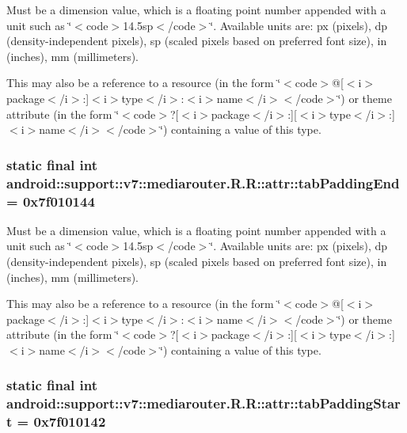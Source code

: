 Must be a dimension value, which is a floating point number appended with a unit such as \char`\"{}$<$code$>$14.5sp$<$/code$>$\char`\"{}. Available units are: px (pixels), dp (density-independent pixels), sp (scaled pixels based on preferred font size), in (inches), mm (millimeters). 

This may also be a reference to a resource (in the form \char`\"{}$<$code$>$@\mbox{[}$<$i$>$package$<$/i$>$:\mbox{]}$<$i$>$type$<$/i$>$:$<$i$>$name$<$/i$>$$<$/code$>$\char`\"{}) or theme attribute (in the form \char`\"{}$<$code$>$?\mbox{[}$<$i$>$package$<$/i$>$:\mbox{]}\mbox{[}$<$i$>$type$<$/i$>$:\mbox{]}$<$i$>$name$<$/i$>$$<$/code$>$\char`\"{}) containing a value of this type. \hypertarget{classandroid_1_1support_1_1v7_1_1mediarouter_1_1_r_1_1attr_1f064924cb6afc302c3dee72ad7ef4fe}{
\subsubsection[{tabPaddingEnd}]{\setlength{\rightskip}{0pt plus 5cm}static final int android::support::v7::mediarouter.R.R::attr::tabPaddingEnd = 0x7f010144}}
\label{classandroid_1_1support_1_1v7_1_1mediarouter_1_1_r_1_1attr_1f064924cb6afc302c3dee72ad7ef4fe}


Must be a dimension value, which is a floating point number appended with a unit such as \char`\"{}$<$code$>$14.5sp$<$/code$>$\char`\"{}. Available units are: px (pixels), dp (density-independent pixels), sp (scaled pixels based on preferred font size), in (inches), mm (millimeters). 

This may also be a reference to a resource (in the form \char`\"{}$<$code$>$@\mbox{[}$<$i$>$package$<$/i$>$:\mbox{]}$<$i$>$type$<$/i$>$:$<$i$>$name$<$/i$>$$<$/code$>$\char`\"{}) or theme attribute (in the form \char`\"{}$<$code$>$?\mbox{[}$<$i$>$package$<$/i$>$:\mbox{]}\mbox{[}$<$i$>$type$<$/i$>$:\mbox{]}$<$i$>$name$<$/i$>$$<$/code$>$\char`\"{}) containing a value of this type. \hypertarget{classandroid_1_1support_1_1v7_1_1mediarouter_1_1_r_1_1attr_6ffc81c072c870a642da3b9c72742e76}{
\subsubsection[{tabPaddingStart}]{\setlength{\rightskip}{0pt plus 5cm}static final int android::support::v7::mediarouter.R.R::attr::tabPaddingStart = 0x7f010142}}
\label{classandroid_1_1support_1_1v7_1_1mediarouter_1_1_r_1_1attr_6ffc81c072c870a642da3b9c72742e76}


